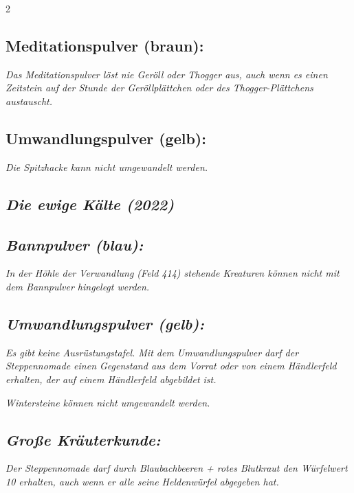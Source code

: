 \documentclass[10pt, a4paper, oneside]{book}
\newcommand{\fan}[1]{\textit{#1}}
\begin{document}
\begin{multicols*}{2}
\begin{bgcolor}[color-DZ]
\subsection{Meditationspulver (braun):}

\fan{Das Meditationspulver löst nie Geröll oder Thogger aus, auch wenn es einen Zeitstein auf der Stunde der Geröllplättchen oder des Thogger-Plättchens austauscht.}



\subsection{Umwandlungspulver (gelb):}

\fan{Die Spitzhacke kann nicht umgewandelt werden.}

\end{bgcolor}




\begin{bgcolor}
\section{\fan{Die ewige Kälte (2022)}}


\subsection{\fan{Bannpulver (blau):}}

\fan{In der Höhle der Verwandlung (Feld 414) stehende Kreaturen können nicht mit dem Bannpulver hingelegt werden.}



\subsection{\fan{Umwandlungspulver (gelb):}}


\fan{Es gibt keine Ausrüstungstafel. Mit dem Umwandlungspulver darf der Steppennomade einen Gegenstand aus dem Vorrat oder von einem Händlerfeld erhalten, der auf einem Händlerfeld abgebildet ist.}

\fan{Wintersteine können nicht umgewandelt werden.}


\subsection{\fan{Große Kräuterkunde:}}

\fan{Der Steppennomade darf durch Blaubachbeeren + rotes Blutkraut den Würfelwert 10 erhalten, auch wenn er alle seine Heldenwürfel abgegeben hat.}




\end{bgcolor}
\end{multicols*}
\end{document}
